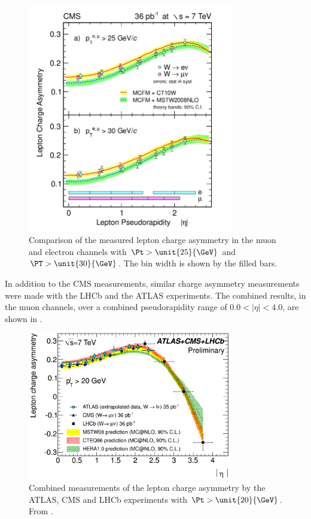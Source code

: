 \begin{figure}[htbp]
  \begin{center}
  \includegraphics*[width=0.8\textwidth]{combined}
  \caption[Comparison of the measured lepton charge asymmetry in the muon and
electron channels] { Comparison of the measured lepton charge asymmetry in the
muon and electron channels with $\Pt>\unit{25}{\GeV}$ and $\PT>\unit{30}{\GeV}$.
The bin width is shown by the filled bars\cite{asym36}.}
  \label{fig:combined}
  \end{center}
\end{figure}

In addition to the CMS measurements, similar charge asymmetry measurements were
made with the LHCb and the ATLAS experiments. The combined results, in the muon
channels, over a combined pseudorapidity range of $0.0 < |\eta | < 4.0$, are
shown in .
\begin{figure}[htbp]
  \begin{center}
  \includegraphics*[width=0.8\textwidth]{atlas_cms_lhcb}
  \caption[Combined measurements of the lepton charge asymmetry by the ATLAS,
CMS and LHCb experiments with $\Pt>\unit{20}{\GeV}$.] {Combined measurements of
the lepton charge asymmetry by the ATLAS, CMS and LHCb experiments with
$\Pt>\unit{20}{\GeV}$. From \cite{ATLAS-CONF-2011-129}.}
  \label{fig:ex_combined}
  \end{center}
\end{figure}

